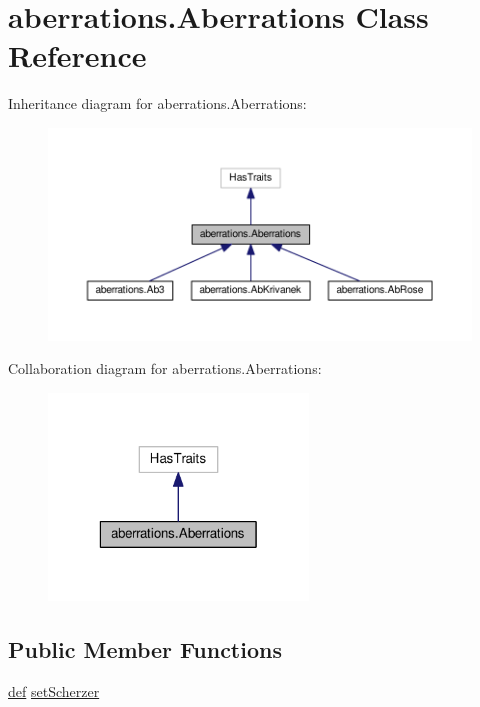 \hypertarget{classaberrations_1_1_aberrations}{\section{aberrations.\-Aberrations Class Reference}
\label{classaberrations_1_1_aberrations}
}


Inheritance diagram for aberrations.\-Aberrations\-:
\nopagebreak
\begin{figure}[H]
\begin{center}
\leavevmode
\includegraphics[width=350pt]{classaberrations_1_1_aberrations__inherit__graph}
\end{center}
\end{figure}


Collaboration diagram for aberrations.\-Aberrations\-:
\nopagebreak
\begin{figure}[H]
\begin{center}
\leavevmode
\includegraphics[width=196pt]{classaberrations_1_1_aberrations__coll__graph}
\end{center}
\end{figure}
\subsection*{Public Member Functions}
\begin{DoxyCompactItemize}
\item 
\hyperlink{sim_image_from_wave_8m_a72b6b8e83430abf007f20aeae4dc2f74}{def} \hyperlink{classaberrations_1_1_aberrations_a015078e5a61519f69a0b0a8dce600fbd}{set\-Scherzer}
\end{DoxyCompactItemize}
